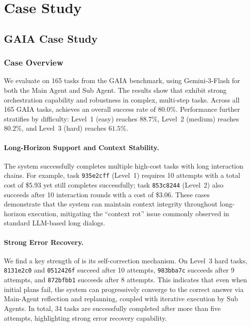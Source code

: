 \section{Case Study}
\label{app:case_study}

\subsection{GAIA Case Study}

\subsubsection{Case Overview}

We evaluate \our{} on 165 tasks from the GAIA benchmark, using Gemini-3-Flash for both the Main Agent and Sub Agent. The results show that \our{} exhibit strong orchestration
capability and robustness in complex, multi-step tasks.
Across all 165 \textsc{GAIA} tasks, \textsc{\our{}} achieves an overall success rate of $80.0\%$. Performance further stratifies by difficulty: Level~1 (easy) reaches $88.7\%$, Level~2 (medium) reaches $80.2\%$, and Level~3 (hard) reaches $61.5\%$. 

\paragraph{Long-Horizon Support and Context Stability.}
The system successfully completes multiple high-cost tasks with long interaction chains. For example, task \texttt{935e2cff} (Level~1) requires 10 attempts with a total cost of \$5.93 yet still completes successfully; task \texttt{853c8244} (Level~2) also succeeds after 10 interaction rounds with a cost of \$3.06. These cases demonstrate that the system can maintain context integrity throughout long-horizon execution, mitigating the ``context rot'' issue commonly observed in standard LLM-based long dialogs.

\paragraph{Strong Error Recovery.}
We find a key strength of \textsc{\our{}} is its self-correction mechanism. On Level~3 hard tasks, \texttt{8131e2c0} and \texttt{0512426f} succeed after 10 attempts, \texttt{983bba7c} succeeds after 9 attempts, and \texttt{872bfbb1} succeeds after 8 attempts. This indicates that even when initial plans fail, the system can progressively converge to the correct answer via Main-Agent reflection and replanning, coupled with iterative execution by Sub Agents. In total, 34 tasks are successfully completed after more than five attempts, highlighting strong error recovery capability.

